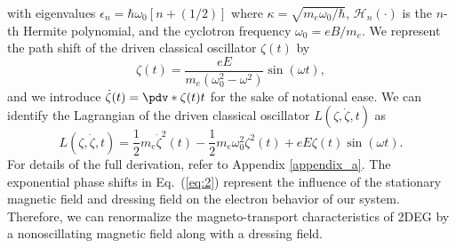 with eigenvalues $\epsilon_n = \hbar \omega_0 [n + (1/2)]$ where $\kappa = \sqrt{{m_e \omega_0}/{\hbar}}$, $\mathcal{H}_n(\cdot)$ is the $n$-th Hermite polynomial, and the cyclotron frequency $\omega_0 = eB/m_e$.
We represent the path shift of the driven classical oscillator $\zeta(t)$ by
\begin{equation} \label{eq:4}
  \zeta(t) = \frac{eE}{m_e(\omega_0^2 - \omega^2)}\sin(\omega t),
\end{equation}
and we introduce $\dot{\zeta}(t) = \pdv*{\zeta(t)}{t}$ for the sake of notational ease. We can identify the Lagrangian of the driven classical oscillator $L(\zeta,\dot{\zeta},t)$ as
\begin{equation} \label{eq:5}
  L(\zeta,\dot{\zeta},t) = \frac{1}{2} m_e\dot{\zeta}^2(t) - \frac{1}{2}m_e\omega_0^2 \zeta^2(t) + eE\zeta(t) \sin(\omega t).
\end{equation}
For details of the full derivation, refer to Appendix \ref{appendix_a}.
The exponential phase shifts in Eq.~(\ref{eq:2}) represent the influence of the stationary magnetic field and dressing field on the electron behavior of our system. Therefore, we can renormalize the magneto-transport characteristics of 2DEG by a nonoscillating magnetic field along with a dressing field.
